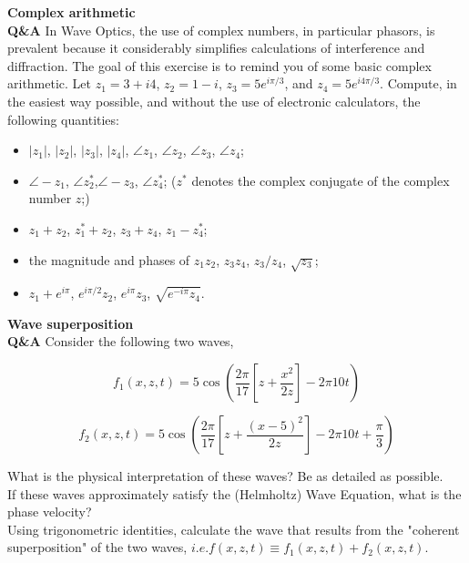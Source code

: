 \documentclass[main.tex]{subfiles}
\begin{document}
\textbf{Complex arithmetic}\\
\textbf{Q\&A} In Wave Optics, the use of complex numbers, in particular phasors, is prevalent because it considerably simplifies calculations of interference and diffraction. The goal of this exercise is to remind you of some basic complex arithmetic. Let $z_1 = 3 + i4$, $z_2 = 1-i$, $z_3 = 5e^{i\pi /3}$, and $z_4=5e^{i4\pi/3}$. Compute, in the easiest way possible, and without the use of electronic calculators, the following quantities:

\begin{itemize}
  \item $|z_1|$, $|z_2|$, $|z_3|$, $|z_4|$, $\angle z_1$, $\angle z_2$, $\angle z_3$, $\angle z_4$;
  \item $\angle -z_1$, $\angle z_2^*$,$\angle -z_3$, $\angle z_4^*$; ($z^*$ denotes the complex conjugate of the complex number $z$;)
  \item $z_1 + z_2$, $z_1^* + z_2$, $z_3 + z_4$, $z_1 - z_4^*$;
  \item the magnitude and phases of  $z_1 z_2$, $z_3 z_4$, $z_3 / z_4$, $\sqrt{z_3}$;
  \item $z_1 + e^{i \pi}$, $e^{i \pi / 2}z_2$, $e^{i\pi}z_3$, $\sqrt{e^{-i\pi}z_4}$.
\end{itemize}

\textbf{Wave superposition}\\
\textbf{Q\&A} Consider the following two waves,

\begin{equation}\label{eq:ws_1}
f_1(x,z,t) = 5\cos \left(\frac{2 \pi}{17} \left[ z+\frac{x^2}{2z} \right] -2\pi 10t \right)
\end{equation}

\begin{equation}\label{eq:ws_2}
f_2(x,z,t) = 5\cos \left(\frac{2 \pi}{17} \left[ z+\frac{(x-5)^2}{2z} \right] -2\pi 10t + \frac{\pi}{3} \right)
\end{equation}

What is the physical interpretation of these waves? Be as detailed as possible.\\

If these waves approximately satisfy the (Helmholtz) Wave Equation, what is the phase velocity?\\

Using trigonometric identities, calculate the wave that results from the "coherent superposition" of the two waves, $i.e. f(x,z,t) \equiv f_1(x,z,t) + f_2(x,z,t)$.\\
\end{document}
